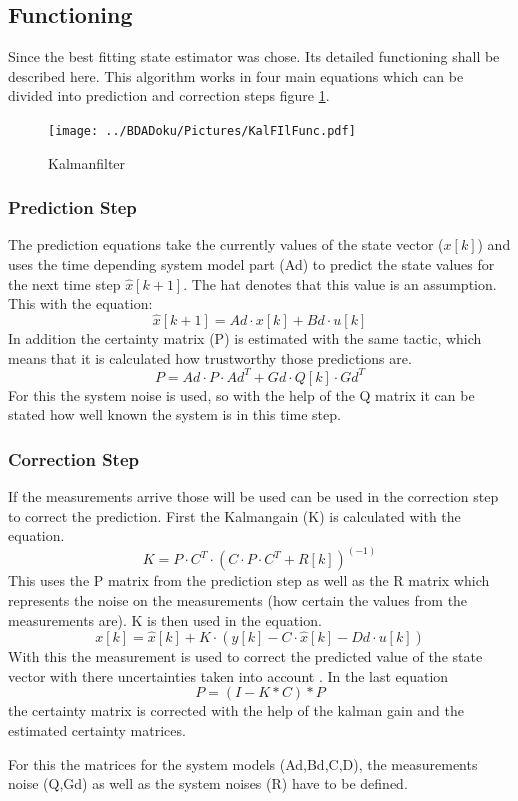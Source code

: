  \subsection{Functioning}
  Since the best fitting state estimator was chose. Its detailed functioning shall be described here.
  This algorithm works in four main equations which can be divided into prediction and correction steps figure \ref{fig:Kalmanfilter}.

  \begin{figure}[h!]
    \centering
    \texttt{[image: ../BDADoku/Pictures/KalFIlFunc.pdf]}
    \caption{Kalmanfilter}
    \label{fig:Kalmanfilter}
  \end{figure}

  \subsubsection{Prediction Step}
  The prediction equations take the currently values of the state vector ($x[k]$)
  and uses the time depending system model part (Ad) to predict the state values for the next time step $\hat{x}[k+1]$.
  The hat denotes that this value is an assumption.
  This with the equation: $$ \hat{x}[k+1] = Ad\cdot x[k] + Bd\cdot u[k] $$
  In addition the certainty matrix (P) is estimated with the same tactic, which means that it is calculated how trustworthy those predictions are.
  $$ P = Ad\cdot P\cdot Ad^T + Gd\cdot Q[k]\cdot Gd^T$$
  For this the system noise is used, so with the help of the Q matrix it can be stated how well known the system is in this
  time step.

  \subsubsection{Correction Step}
  If the measurements arrive those will be used can be used in the correction step to correct the prediction.
  First the Kalmangain (K) is calculated with the equation.
  $$ K = P\cdot C^T\cdot (C \cdot P \cdot C^T + R[k])^{(-1)} $$ 
  This uses the P matrix from the prediction step as well as the R matrix which represents the noise on the measurements (how certain the values from the measurements are).
  K is then used in the equation. $$x[k] = \hat{x}[k] + K\cdot (y[k] - C\cdot \hat{x}[k]-Dd\cdot u[k])$$
  With this the measurement is used to correct the predicted value of the state vector with there uncertainties taken into account \cite{DavidWSchultz2004}. 
  In the last equation $$P = (I − K * C) * P $$ the certainty matrix is corrected with the help of the kalman gain and the estimated certainty matrices.
  
  For this the matrices for the system models (Ad,Bd,C,D), the measurements noise (Q,Gd) as well as the system noises (R) have to be defined.
  
  
  
  